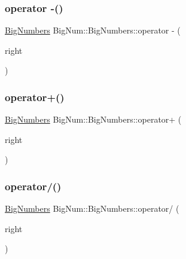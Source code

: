 \mbox{\label{class_big_num_1_1_big_numbers_a06db1ba12eaf5ca752aa8a8b87efe531}} 
\subsubsection{\texorpdfstring{operator -\/()}{operator -()}}
{\footnotesize\ttfamily \mbox{\hyperlink{class_big_num_1_1_big_numbers}{Big\+Numbers}} Big\+Num\+::\+Big\+Numbers\+::operator -\/ (\begin{DoxyParamCaption}\item[{const \mbox{\hyperlink{class_big_num_1_1_big_numbers}{Big\+Numbers}} \&}]{right }\end{DoxyParamCaption})}

\mbox{\label{class_big_num_1_1_big_numbers_aeed7d0a3044d69217bf540f4b3961f1c}} 
\subsubsection{\texorpdfstring{operator+()}{operator+()}}
{\footnotesize\ttfamily \mbox{\hyperlink{class_big_num_1_1_big_numbers}{Big\+Numbers}} Big\+Num\+::\+Big\+Numbers\+::operator+ (\begin{DoxyParamCaption}\item[{const \mbox{\hyperlink{class_big_num_1_1_big_numbers}{Big\+Numbers}} \&}]{right }\end{DoxyParamCaption})}

\mbox{\label{class_big_num_1_1_big_numbers_acaae8dc39899d3efac164375db5198fc}} 
\subsubsection{\texorpdfstring{operator/()}{operator/()}}
{\footnotesize\ttfamily \mbox{\hyperlink{class_big_num_1_1_big_numbers}{Big\+Numbers}} Big\+Num\+::\+Big\+Numbers\+::operator/ (\begin{DoxyParamCaption}\item[{const \mbox{\hyperlink{class_big_num_1_1_big_numbers}{Big\+Numbers}} \&}]{right }\end{DoxyParamCaption})}

